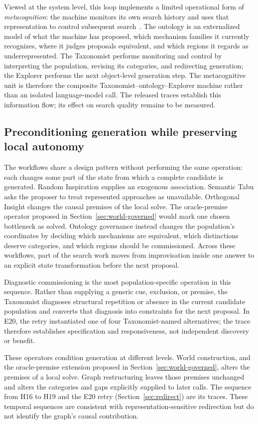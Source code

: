 \documentclass[11pt,a4paper]{article}
\begin{document}
Viewed at the system level, this loop implements a limited operational form of \emph{metacognition}: the machine monitors its own search history and uses that representation to control subsequent search~\cite{cox2005metacognition}. The ontology is an externalized model of what the machine has proposed, which mechanism families it currently recognizes, where it judges proposals equivalent, and which regions it regards as underrepresented. The Taxonomist performs monitoring and control by interpreting the population, revising its categories, and redirecting generation; the Explorer performs the next object-level generation step. The metacognitive unit is therefore the composite Taxonomist--ontology--Explorer machine rather than an isolated language-model call. The released traces establish this information flow; its effect on search quality remains to be measured.

\subsection{Preconditioning generation while preserving local autonomy}

The workflows share a design pattern without performing the same operation: each changes some part of the state from which a complete candidate is generated. Random Inspiration supplies an exogenous association. Semantic Tabu asks the proposer to treat represented approaches as unavailable. Orthogonal Insight changes the causal premises of the local solve. The oracle-premise operator proposed in Section~\ref{sec:world-governed} would mark one chosen bottleneck as solved. Ontology governance instead changes the population's coordinates by deciding which mechanisms are equivalent, which distinctions deserve categories, and which regions should be commissioned. Across these workflows, part of the search work moves from improvisation inside one answer to an explicit state transformation before the next proposal.

Diagnostic commissioning is the most population-specific operation in this sequence. Rather than supplying a generic cue, exclusion, or premise, the Taxonomist diagnoses structural repetition or absence in the current candidate population and converts that diagnosis into constraints for the next proposal. In E20, the retry instantiated one of four Taxonomist-named alternatives; the trace therefore establishes specification and responsiveness, not independent discovery or benefit.

These operators condition generation at different levels. World construction, and the oracle-premise extension proposed in Section~\ref{sec:world-governed}, alters the premises of a local solve. Graph restructuring leaves those premises unchanged and alters the categories and gaps explicitly supplied to later calls. The sequence from H16 to H19 and the E20 retry (Section~\ref{sec:redirect}) are its traces. These temporal sequences are consistent with representation-sensitive redirection but do not identify the graph's causal contribution.
\end{document}
